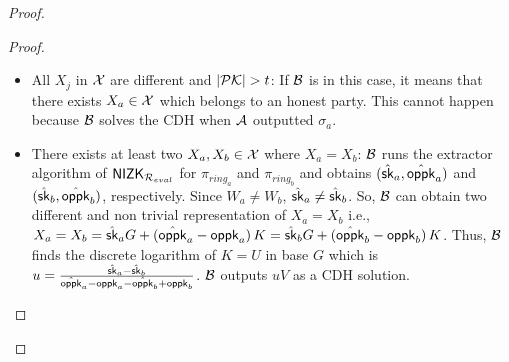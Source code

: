 \begin{proof}
\begin{proof}
\begin{itemize}
			\item All $ X_j $ in $ {\mathcal{X}} $ are different and $ |{\mathcal{PK}}| > t $: If $ \mathcal{B} $ is in this case, it means that there exists $ X_a \in {\ensuremath{\mathcal{X}}} $ which belongs to an honest party. This cannot happen because $ \mathcal{B} $ solves the CDH when $ \mathcal{A} $ outputted $ \sigma_a $. 
			\item  There exists at least two $ X_a,X_b \in {\ensuremath{\mathcal{X}}} $ where $ X_a = X_b $: $ \mathcal{B} $ runs the extractor algorithm of $ {\mathsf{NIZK}}_{\mathcal{R}_{eval}} $ for $ \pi_{ring_a} $ and $ \pi_{ring_b} $ and obtains $(\hat{\mathsf{sk}}_a,\hat{\mathsf{oppk}}_a )$ and $(\hat{\mathsf{sk}}_b,\hat{\mathsf{oppk}}_b )$, respectively. Since $ W_a \neq W_b $, $ \hat{\mathsf{sk}}_a \neq \hat{\mathsf{sk}}_b $. So, $ \mathcal{B} $ can obtain two different and non trivial representation of $ X_a = X_b $ i.e., $ X_a = X_b = \hat{\mathsf{sk}}_aG + (\hat{\mathsf{oppk}}_a - \mathsf{oppk}_a) \, K = \hat{\mathsf{sk}}_bG + (\hat{\mathsf{oppk}}_b - \mathsf{oppk}_b) \, K $. Thus, $ \mathcal{B} $ finds the discrete logarithm of $ K = U $ in base $ G $ which is $ u = \frac{\hat{\mathsf{sk}}_a - \hat{\mathsf{sk}}_b}{\hat{\mathsf{oppk}}_a -\mathsf{oppk}_a -\hat{\mathsf{oppk}}_b + \mathsf{oppk}_b} $. $ \mathcal{B} $ outputs $ uV $ as a CDH solution.
			\end{itemize}
			

\end{proof}
\end{proof}
